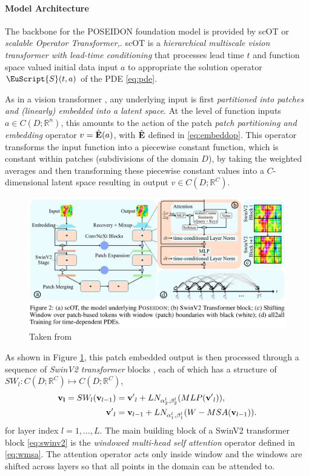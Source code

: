 \documentclass[reqno,10pt]{amsart}
\theoremstyle{plain}
\theoremstyle{definition}
\newcommand{\bb}[1]{\mathbb{#1}}
\newcommand{\eus}[1]{\EuScript{#1}}
\begin{document}
\paragraph{\bf Model Architecture} The backbone for the {\large P}OSEIDON foundation model is provided by scOT or {\it scalable Operator Transformer,}. scOT is a {\it hierarchical multiscale vision transformer with lead-time conditioning} that processes lead time $t$ and function space valued initial data input $a$ to appropriate the solution operator $\eus S(t,a)$ of the PDE \ref{eq:pde}.

\noindent As in a vision transformer \cite{AD2021}, any underlying input is first {\it partitioned into patches and (linearly) embedded into a latent space}. At the level of function inputs $a \in C(D;\bb R^n)$, this amounts to the action of the patch {\it patch partitioning and embedding} operator $v = \hat{\bf E}(a)$, with $\hat{\bf E}$ defined in \ref{eq:embeddop}. This operator transforms the input function into a piecewise constant function, which is constant within patches (subdivisions of the domain $D$), by taking the weighted averages and then transforming these piecewise constant values into a $C$-dimensional latent space resulting in output $v \in C(D;\bb R^C)$.
\begin{figure}[!ht]
    \centering
    \includegraphics[width=\textwidth]{poseidon_arch.png}
    \caption{Taken from \cite{MH2024}}
    \label{fig:architecture}
\end{figure}

\noindent As shown in Figure \ref{fig:architecture}, this patch embedded output is then processed through a sequence of {\it SwinV2 transformer} blocks \cite{ZL2022,ZLiu2021}, each of which has a structure of $SW_l : C(D;\bb R^C) \mapsto C(D;\bb R^C)$,
\begin{equation}\label{eq:swinv2}
    \begin{aligned}        
        {\bf v_l} = SW_l({\bf v}_{l-1}) &= {\bf v'}_l + LN_{\alpha^l_2, \beta_2^l}(MLP({\bf v'}_l)), \\
        {\bf v'}_l &= {\bf v}_{l-1} + LN_{\alpha_1^l, \beta_1^l} (W-MSA({\bf v}_{l-1})).
    \end{aligned}
\end{equation}
for layer index $ l = 1, \dots ,L$. The main building block of a SwinV2 transformer block \ref{eq:swinv2} is the {\it windowed multi-head self attention} operator defined in \ref{eq:wmsa}. The attention operator acts only inside window and the windows are shifted across layers so that all points in the domain can be attended to.
\end{document}
